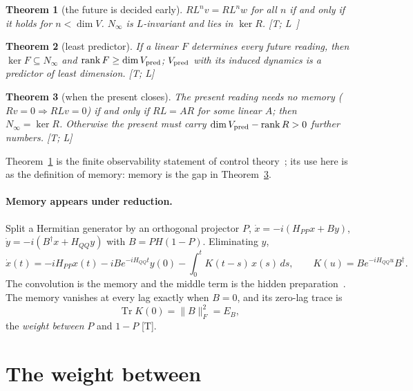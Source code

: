 \documentclass[11pt]{article}
\newtheorem{theorem}{Theorem}
\theoremstyle{definition}
\newcommand{\grade}[1]{\textsf{\small[#1]}}
\newcommand{\Tr}{\operatorname{Tr}}
\newcommand{\F}[1]{\lVert #1\rVert_F}
\begin{document}
\begin{theorem}[the future is decided early]\label{thm:early}
$RL^nv=RL^nw$ for all $n$ if and only if it holds for $n<\dim V$. $N_\infty$ is $L$-invariant and lies in $\ker R$. \grade{T; L~\cite{WB}}
\end{theorem}

\begin{theorem}[least predictor]\label{thm:least}
If a linear $F$ determines every future reading, then $\ker F\subseteq N_\infty$ and $\operatorname{rank}F\ge\dim V_{\rm pred}$; $V_{\rm pred}$ with its induced dynamics is a predictor of least dimension. \grade{T; L}
\end{theorem}

\begin{theorem}[when the present closes]\label{thm:close}
The present reading needs no memory ($Rv=0\Rightarrow RLv=0$) if and only if $RL=AR$ for some linear $A$; then $N_\infty=\ker R$. Otherwise the present must carry $\dim V_{\rm pred}-\operatorname{rank}R>0$ further numbers. \grade{T; L}
\end{theorem}

Theorem~\ref{thm:early} is the finite observability statement of control theory~\cite{Kalman}; its use here is as the definition of memory: memory is the gap in Theorem~\ref{thm:close}.

\paragraph{Memory appears under reduction.} Split a Hermitian generator by an orthogonal projector $P$, $\dot x=-i(H_{PP}x+By)$, $\dot y=-i(B^\dagger x+H_{QQ}y)$ with $B=PH(1-P)$. Eliminating $y$,
\begin{equation}\label{eq:kernel}
\dot x(t)=-iH_{PP}x(t)-iBe^{-iH_{QQ}t}y(0)-\int_0^tK(t-s)\,x(s)\,ds,\qquad K(u)=Be^{-iH_{QQ}u}B^\dagger .
\end{equation}
The convolution is the memory and the middle term is the hidden preparation~\cite{Zwanzig}. The memory vanishes at every lag exactly when $B=0$, and its zero-lag trace is
\begin{equation}\label{eq:EB}
\Tr K(0)=\F{B}^2=E_B ,
\end{equation}
the \emph{weight between} $P$ and $1-P$ \grade{T}.

\section{The weight between}\label{sec:weight}
\end{document}
